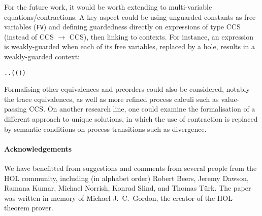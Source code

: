 For the future work, it would be worth extending
to multi-variable equations/contractions. A key aspect could be using unguarded constants as free variables
(\texttt{FV}) and defining guardedness directly on expressions of type CCS (instead of
CCS $\rightarrow$ CCS), then linking to contexts. For instance, an expression is weakly-guarded when each
of its free variables, replaced by a hole, results in a weakly-guarded context:
\begin{alltt}
\HOLTokenTurnstile{}   \HOLSymConst{\HOLTokenEquiv{}}
   \HOLSymConst{\HOLTokenForall{}}.  \HOLSymConst{\HOLTokenIn{}}   \HOLSymConst{\HOLTokenImp{}} \HOLSymConst{\HOLTokenForall{}}.   \HOLSymConst{\HOLTokenConj{}} ( ( ) \HOLSymConst{=} ) \HOLSymConst{\HOLTokenImp{}}  
\end{alltt}

Formalising other equivalences and preorders could also be considered,
notably the trace equivalences, as well as more refined process
calculi such as value-passing CCS.
%
On another research line, one could examine the formalisation of a different
approach \cite{DurierHS17} to unique
solutions, in which the use of contraction is
replaced by semantic conditions on process transitions such as
divergence. 



\paragraph{Acknowledgements}

We have benefitted from suggestions and comments 
from several people from the HOL
community, including (in alphabet order) Robert Beers, Jeremy Dawson,
Ramana Kumar,
Michael Norrish, 
Konrad Slind, and
Thomas T\"{u}rk.
%
The 
paper was written in memory of Michael J.~C.~Gordon, the creator of the HOL theorem prover.
